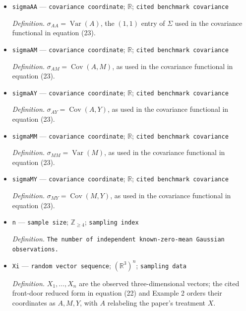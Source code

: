 \documentclass{article}
\begin{document}
\begin{itemize}
  \par\smallskip\noindent\emph{Definition.} The coefficient on \(A\) in the cited benchmark reduced-form equation (22) for \(Y\), representing association generated by unobserved treatment--outcome confounding rather than a direct causal effect.
  \item \texttt{sigmaAA} --- \texttt{covariance coordinate}; \(\mathbb R\); \texttt{cited benchmark covariance}
  \par\smallskip\noindent\emph{Definition.} \(\sigma_{AA}=\operatorname{Var}(A)\), the \((1,1)\) entry of \(\Sigma\) used in the covariance functional in equation (23).
  \item \texttt{sigmaAM} --- \texttt{covariance coordinate}; \(\mathbb R\); \texttt{cited benchmark covariance}
  \par\smallskip\noindent\emph{Definition.} \(\sigma_{AM}=\operatorname{Cov}(A,M)\), as used in the covariance functional in equation (23).
  \item \texttt{sigmaAY} --- \texttt{covariance coordinate}; \(\mathbb R\); \texttt{cited benchmark covariance}
  \par\smallskip\noindent\emph{Definition.} \(\sigma_{AY}=\operatorname{Cov}(A,Y)\), as used in the covariance functional in equation (23).
  \item \texttt{sigmaMM} --- \texttt{covariance coordinate}; \(\mathbb R\); \texttt{cited benchmark covariance}
  \par\smallskip\noindent\emph{Definition.} \(\sigma_{MM}=\operatorname{Var}(M)\), as used in the covariance functional in equation (23).
  \item \texttt{sigmaMY} --- \texttt{covariance coordinate}; \(\mathbb R\); \texttt{cited benchmark covariance}
  \par\smallskip\noindent\emph{Definition.} \(\sigma_{MY}=\operatorname{Cov}(M,Y)\), as used in the covariance functional in equation (23).
  \item \texttt{n} --- \texttt{sample size}; \(\mathbb Z_{\geq4}\); \texttt{sampling index}
  \par\smallskip\noindent\emph{Definition.} \texttt{The number of independent known-\allowbreak{}zero-\allowbreak{}mean Gaussian observations.}
  \item \texttt{Xi} --- \texttt{random vector sequence}; \((\mathbb R^3)^n\); \texttt{sampling data}
  \par\smallskip\noindent\emph{Definition.} \(X_1,\ldots,X_n\) are the observed three-dimensional vectors; the cited front-door reduced form in equation (22) and Example 2 orders their coordinates as \(A,M,Y\), with \(A\) relabeling the paper's treatment \(X\).

\end{itemize}
\end{document}
